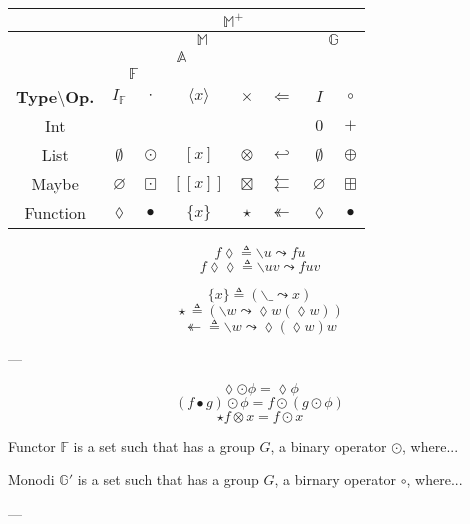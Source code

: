 \documentclass{jsarticle}
\def\[{[\![}
\def\]{]\!]}
\newcommand{\htypeclassname}[1]{\mathbb{#1}}
\newcommand{\identity}{I}
\newcommand{\binaryop}{\circ}
\newcommand{\listtype}[1]{[#1]}
\newcommand{\maybetype}[1]{\[#1\]}
\newcommand{\functype}[1]{\{#1\}}
\newcommand{\hrightarrow}{\leadsto}
\newcommand{\hlambdaparameter}{\lozenge}
\newcommand{\hfmap}{\cdot}
\newcommand{\hlistfmap}{\odot}
\newcommand{\hmaybefmap}{\boxdot}
\newcommand{\hfuncfmap}{\bullet}
\newcommand{\hemptylist}{\emptyset}
\newcommand{\hnothing}{\varnothing}
\newcommand{\hid}{\hlambdaparameter}
\newcommand{\hlambda}{\backslash}
\newcommand{\hlambdaparameterignore}{\_}
\newcommand{\hpure}[1]{\langle#1\rangle}
\newcommand{\hpurelist}[1]{\listtype{#1}}
\newcommand{\hpuremaybe}[1]{\maybetype{#1}}
\newcommand{\hpurefunc}[1]{\functype{#1}}
\newcommand{\hpurefuncimp}[1]{(\hlambda\hlambdaparameterignore\hrightarrow#1)}
\newcommand{\hafmap}{\times}
\newcommand{\hlistafmap}{\otimes}
\newcommand{\hmaybeafmap}{\boxtimes}
\newcommand{\hfuncafmap}{\star}
\newcommand{\hfuncafmapimp}[1]{(\hlambda#1\hrightarrow\hlambdaparameter#1(\hlambdaparameter#1))}
\newcommand{\hbind}{\Leftarrow}
\newcommand{\hlistbind}{\hookleftarrow}
\newcommand{\hmaybebind}{\leftleftarrows}
\newcommand{\hlistplus}{\oplus}
\newcommand{\hmaybeplus}{\boxplus}
\newcommand{\hmfbind}{\twoheadleftarrow}
\newcommand{\hmfbindimp}[1]{\hlambda#1\hrightarrow\hlambdaparameter(\hlambdaparameter#1)#1}
\begin{document}
\begin{center}
\begin{tabular}{||c||c|c|c|c|c|c|c||}
\hline
{ }
    &\multicolumn{7}{|c||}{$\htypeclassname{M}^+$}\\
\hline
{ }
    &\multicolumn{5}{|c|}{$\htypeclassname{M}$}
    &\multicolumn{2}{|c||}{$\htypeclassname{G}$}\\
\hline
{ }
    &\multicolumn{4}{|c|}{$\htypeclassname{A}$}
    &
    &\multicolumn{2}{|c||}{ }\\
\hline
{ }
    &\multicolumn{2}{|c|}{$\htypeclassname{F}$}
    &\multicolumn{2}{|c|}{ }
    &
    &\multicolumn{2}{|c||}{ }\\
\hline
\textbf{Type$\setminus$Op.}
    &$\identity_\htypeclassname{F}$
    &$\hfmap$
    &$\hpure{x}$
    &$\hafmap$
    &$\hbind$
    &$\identity$
    &$\binaryop$\\
\hline\hline
Int
    &
    &
    &
    &
    &
    &$0$
    &$+$\\
\hline
List
    &$\hemptylist$
    &$\hlistfmap$
    &$\hpurelist{x}$
    &$\hlistafmap$
    &$\hlistbind$
    &$\hemptylist$
    &$\hlistplus$\\
\hline
Maybe
    &$\hnothing$
    &$\hmaybefmap$
    &$\hpuremaybe{x}$
    &$\hmaybeafmap$
    &$\hmaybebind$
    &$\hnothing$
    &$\hmaybeplus$\\
\hline
Function
    &$\hid$
    &$\hfuncfmap$
    &$\hpurefunc{x}$
    &$\hfuncafmap$
    &$\hmfbind$
    &$\hid$
    &$\hfuncfmap$\\
\hline
\end{tabular}
\end{center}

$$f\hlambdaparameter\triangleq\hlambda u\hrightarrow fu$$
$$f\hlambdaparameter\hlambdaparameter\triangleq\hlambda uv\hrightarrow fuv$$

$$\hpurefunc{x}\triangleq\hpurefuncimp{x}$$
$${}\hfuncafmap{}\triangleq\hfuncafmapimp{w}$$
$${}\hmfbind{}\triangleq\hmfbindimp{w}$$

---

$$\lozenge\odot\phi=\lozenge\phi$$
$$(f\bullet g)\odot\phi=f\odot(g\odot\phi)$$
$$\star f\otimes x=f\odot x$$


Functor $\htypeclassname{F}$ is a set such that has a group $G$, a binary operator $\odot$, where...

Monodi $\htypeclassname{G}'$ is a set such that has a group $G$, a birnary operator $\circ$, where...

---
\end{document}
